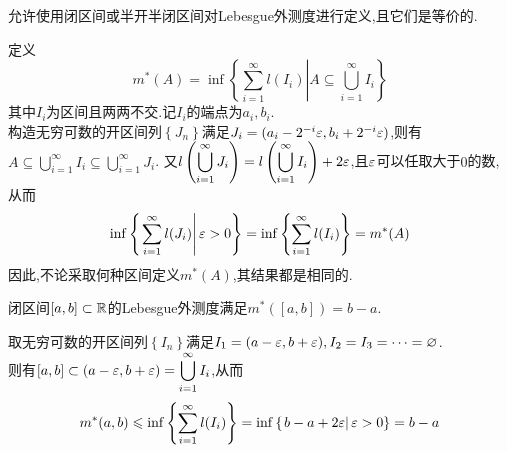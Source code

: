 \documentclass[a4paper]{ctexart}
\begin{document}
\begin{theorem}[Lemma 1.3.2]
    允许使用闭区间或半开半闭区间对Lebesgue外测度进行定义,且它们是等价的.
\end{theorem}
\begin{solution}[Proof.]
    定义$$m^*(A)=\inf\left\{\left.\sum_{i=1}^{\infty}l(I_i)\right|A\subseteq \bigcup_{i=1}^{\infty}I_i\right\}$$
    其中$I_i$为区间且两两不交.记$I_i$的端点为$a_i,b_i$.\\
    构造无穷可数的开区间列$\left\{J_n\right\}$满足$J_i=(a_i-2^{-i}\varepsilon,b_i+2^{-i}\varepsilon)$,则有$\displaystyle A\subseteq\bigcup_{i=1}^{\infty}I_i\subseteq\bigcup_{i=1}^{\infty}J_i$.
    又$\displaystyle l\left(\bigcup_{i=1}^{\infty}J_i\right)=l\left(\bigcup_{i=1}^{\infty}I_i\right)+2\varepsilon$,且$\varepsilon$可以任取大于$0$的数,从而
    $$\inf\left\{\left.\sum_{i=1}^{\infty}l(J_i)\right|\varepsilon>0\right\}=\inf\left\{\sum_{i=1}^{\infty}l(I_i)\right\}=m^*(A)$$
    因此,不论采取何种区间定义$m^*(A)$,其结果都是相同的.
\end{solution}
\begin{theorem}[Lemma 1.3.3]
    闭区间$[a,b]\subset\mathbb{R}$的Lebesgue外测度满足$m^*([a,b])=b-a$.
\end{theorem}
\begin{solution}[Proof.]
    取无穷可数的开区间列$\left\{I_n\right\}$满足$I_1=(a-\varepsilon,b+\varepsilon),I_2=I_3=\cdots=\varnothing$.\\
    则有$\displaystyle [a,b]\subset(a-\varepsilon,b+\varepsilon)=\bigcup_{i=1}^{\infty}I_i$,从而
    $$m^*(a,b)\leqslant\inf\left\{\sum_{i=1}^{\infty}l(I_i)\right\}=\inf\left\{\left.b-a+2\varepsilon\right|\varepsilon>0\right\}=b-a$$
\end{solution}
\end{document}
